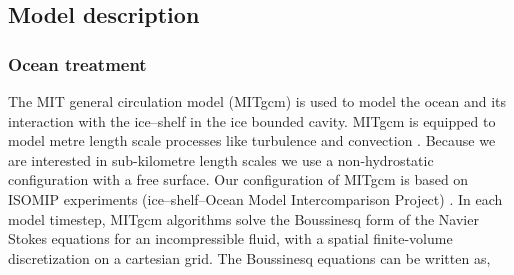 \subsection{Model description}
\subsubsection{Ocean treatment} \label{sec:ocean_treatment}

The MIT general circulation model (MITgcm) \citep{marshall1997finite,marshall1997hydrostatic} is used to model the ocean and its interaction with the ice--shelf in the ice bounded cavity. MITgcm is equipped to model metre length scale processes like turbulence and convection \citep[e.g.]{xu2012numerical}.
Because we are interested in sub-kilometre length scales we use a non-hydrostatic configuration with a free surface. Our configuration of MITgcm is based on ISOMIP experiments (ice--shelf–Ocean Model Intercomparison Project) \citep{holland2003ice}.  In each model timestep, MITgcm algorithms solve the Boussinesq form of the Navier Stokes equations for an incompressible fluid, with a spatial finite-volume discretization on a cartesian grid.
The Boussinesq equations can be written as,


